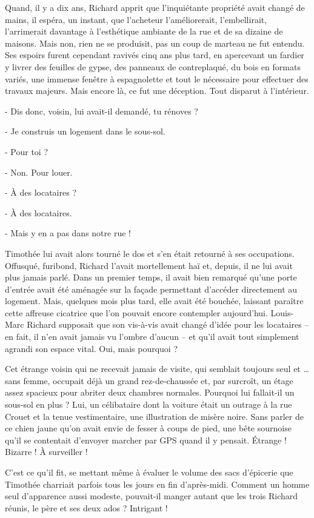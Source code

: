 Quand, il y a dix ans, Richard apprit que l’inquiétante propriété avait changé de mains, il espéra, un instant, que l’acheteur l’améliorerait, l’embellirait, l’arrimerait davantage à l’esthétique ambiante de la rue et de sa dizaine de maisons. Mais non, rien ne se produisit, pas un coup de marteau ne fut entendu. Ses espoirs furent cependant ravivés cinq ans plus tard, en apercevant un fardier y livrer des feuilles de gypse, des panneaux de contreplaqué, du bois en formats variés, une immense fenêtre à espagnolette et tout le nécessaire pour effectuer des travaux majeurs. Mais encore là, ce fut une déception. Tout disparut à l’intérieur.

- Dis donc, voisin, lui avait-il demandé, tu rénoves ?

- Je construis un logement dans le sous-sol.

- Pour toi ?

- Non. Pour louer.

- À des locataires ?

- À des locataires.

- Mais y en a pas dans notre rue !

Timothée lui avait alors tourné le dos et s’en était retourné à ses occupations. Offusqué, furibond, Richard l’avait mortellement haï et, depuis, il ne lui avait plus jamais parlé. Dans un premier temps, il avait bien remarqué qu’une porte d’entrée avait été aménagée sur la façade permettant d’accéder directement au logement. Mais, quelques mois plus tard, elle avait été bouchée, laissant paraître cette affreuse cicatrice que l’on pouvait encore contempler aujourd’hui. Louis-Marc Richard supposait que son vis-à-vis avait changé d’idée pour les locataires – en fait, il n’en avait jamais vu l’ombre d’aucun – et qu’il avait tout simplement agrandi son espace vital. Oui, mais pourquoi ?

Cet étrange voisin qui ne recevait jamais de visite, qui semblait toujours seul et … sans femme, occupait déjà un grand rez-de-chaussée et, par surcroît, un étage assez spacieux pour abriter deux chambres normales. Pourquoi lui fallait-il un sous-sol en plus ? Lui, un célibataire dont la voiture était un outrage à la rue Crouet et la tenue vestimentaire, une illustration de misère noire. Sans parler de ce chien jaune qu’on avait envie de fesser à coups de pied, une bête sournoise qu’il se contentait d’envoyer marcher par GPS quand il y pensait. Étrange ! Bizarre ! À surveiller !

C’est ce qu’il fit, se mettant même à évaluer le volume des sacs d’épicerie que Timothée charriait parfois tous les jours en fin d’après-midi. Comment un homme seul d’apparence aussi modeste, pouvait-il manger autant que les trois Richard réunis, le père et ses deux ados ? Intrigant !

